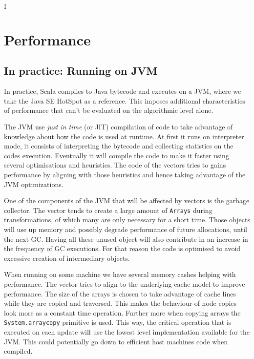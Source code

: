 I%

\chapter{Performance} %

\label{Performance} %



\section{In practice: Running on JVM}
\label{InPractice}

In practice, Scala compiles to Java bytecode and executes on a JVM, where we take the Java SE HotSpot as a reference. This imposes additional characteristics of performance that can't be evaluated on the algorithmic level alone.

The JVM use \emph{just in time} (or JIT) compilation of code to take advantage of knowledge about how the code is used at runtime. At first it runs on interpreter mode, it consists of interpreting the bytecode and collecting statistics on the codes execution. Eventually it will compile the code to make it faster using several optimisations and heuristics. The code of the vectors tries to gains performance by aligning with those heuristics and hence taking advantage of the JVM optimizations.

One of the components of the JVM that will be affected by vectors is the garbage collector. The vector tends to create a large amount of \texttt{Arrays} during transformations, of which many are only necessary for a short time. Those objects will use up memory and possibly degrade performance of future allocations, until the next GC. Having all these unused object will also contribute in an increase in the frequency of GC executions. For that reason the code is optimised to avoid excessive creation of intermediary objects.

When running on some machine we have several memory cashes helping with performance. The vector tries to align to the underlying cache model to improve performance. The size of the arrays is chosen to take advantage of cache lines while they are copied and traversed. This makes the behaviour of node copies look more as a constant time operation. Further more when copying arrays the \texttt{System.arraycopy} primitive is used. This way, the critical operation that is executed on each update will use the lowest level implementation available for the JVM. This could potentially go down to efficient host machines code when compiled.

